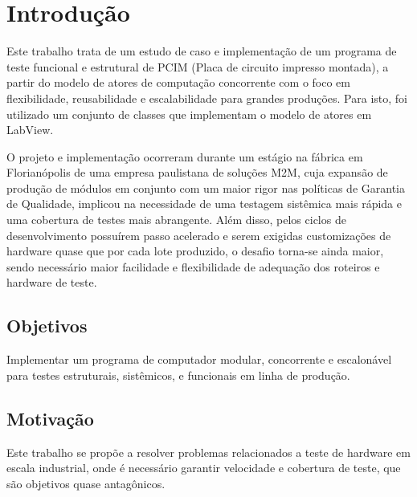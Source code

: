 \chapter{Introdução}
\label{intro}
    
    Este trabalho trata de um estudo de caso e implementação de um programa de teste funcional e estrutural de PCIM (Placa de circuito impresso montada), a partir do modelo de atores de computação concorrente \citep{hewitt2010actor, hewitt2013computation} 
    com o foco em flexibilidade, reusabilidade e escalabilidade para grandes produções. Para isto, foi utilizado um conjunto de classes que implementam o modelo de atores em LabView. 
  
    O projeto e implementação ocorreram durante um estágio na fábrica em Florianópolis de uma empresa paulistana de soluções M2M, cuja expansão de produção de módulos em conjunto com um maior rigor nas políticas de Garantia de Qualidade, implicou na necessidade de uma testagem sistêmica mais rápida e uma cobertura de testes mais abrangente. Além disso, pelos ciclos de desenvolvimento possuírem passo acelerado e serem exigidas customizações de hardware quase que por cada lote produzido, o desafio torna-se ainda maior, sendo necessário maior facilidade e flexibilidade de adequação dos roteiros e hardware de teste.
    
\section{Objetivos}
    Implementar um programa de computador modular, concorrente e escalonável para testes estruturais, sistêmicos, e funcionais em linha de produção.
    
\section{Motivação}
    Este trabalho se propõe a resolver problemas relacionados a teste de hardware em escala industrial, onde é necessário garantir velocidade e cobertura de teste, que são objetivos quase antagônicos.
    
